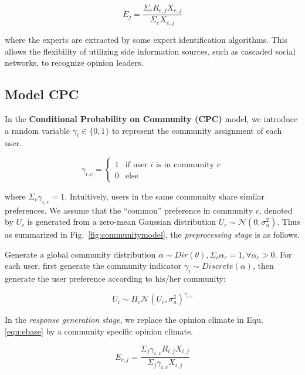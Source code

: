 \documentclass{sig-alternate}
\begin{document}
\begin{equation}\label{eexpert}
E_j = \frac{\Sigma_e R_{e,j}X_{e,j}}{\Sigma_e X_{e,j}}
\end{equation}

where the experts are extracted by some expert identification algorithms. This allows the flexibility of utilizing side information sources, such as cascaded social networks, to recognize opinion leaders. 

\subsection{Model CPC}
In the \textbf{Conditional Probability on Community (CPC)} model, we introduce a random variable $\gamma_i\in \{0,1\}$ to represent the community assignment of each user.

\begin{equation}
\gamma_{i,c}=
\begin{cases}
1& \text{if user $i$ is in community $c$}\\
0& \text{else}
\end{cases}
\end{equation}

where $\Sigma_c \gamma_{i,c}=1$.  Intuitively, users in the same community share similar preferences. We assume that the ``common'' preference in community $c$, denoted by $U_c$ is generated from a zero-mean Gaussian distribution $U_c \sim \mathcal{N}(0,\sigma_u^2)$. Thus as summarized in Fig.~\ref{fig:communitymodel}, the \textit{preprocessing stage} is as follows.

Generate a global community distribution $\alpha\sim Dir(\theta), \Sigma_c \alpha_c=1, \forall \alpha_c>0$. For each user, first generate the community indicator $\gamma_i \sim Discrete(\alpha)$, then generate the user preference according to his/her community:

\begin{equation}\label{equ:preferencebase}
U_i \sim \Pi_c \mathcal{N}(U_c,\sigma_u^2)^{\gamma_{i,c}}
\end{equation}

In the \textit{response generation stage}, we replace the opinion climate in Equ.\ref{equ:ebase} by a community specific opinion climate.

\begin{equation}\label{equ:ecommunity}
 E_{c,j}=\frac{\Sigma_j\gamma_{i,c} R_{i,j}X_{i,j}}{\Sigma_j \gamma_{i,c} X_{i,j}}
\end{equation}
\end{document}
